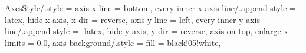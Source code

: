 
\pgfplotsset
{
	AxesStyle/.style =
	{
		axis x line				= bottom,	%
		every inner x axis line/.append style	= {-latex},
		hide x axis,
		x dir					= reverse,
		axis y line				= left,		%
		every inner y axis line/.append style	= {-latex},
		hide y axis,
		y dir					= reverse,
		axis on top,
		enlarge x limits		= 0.0,
	 	axis background/.style	= {fill = black!05!white},
	}
}

